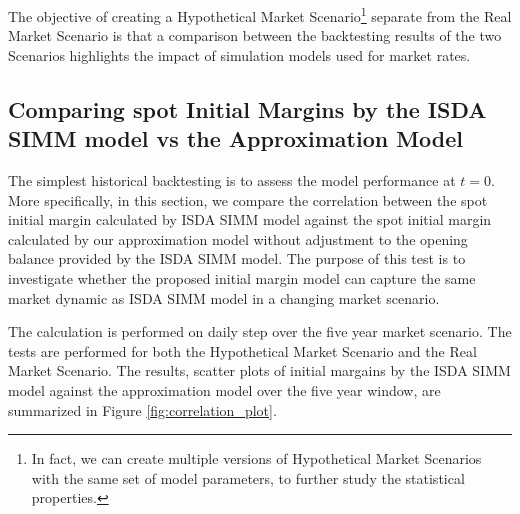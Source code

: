 \documentclass[preprint,12pt]{elsarticle}
\begin{document}
The objective of creating a Hypothetical Market Scenario\footnote{In fact, we can create multiple versions of Hypothetical Market Scenarios with the same set of model parameters, to further study the statistical properties.} separate from the Real Market Scenario is that a comparison between the backtesting results of the two Scenarios highlights the impact of simulation models used for market rates.

\subsection{Comparing spot Initial Margins by the ISDA SIMM model vs the Approximation Model} \label{sec:spotZeroIMTest}

The simplest historical backtesting is to assess the model performance at $t=0$. More specifically, in this section, we compare the correlation between the spot initial margin calculated by ISDA SIMM model against the spot initial margin calculated by our approximation model without adjustment to the opening balance provided by the ISDA SIMM model. The purpose of this test is to investigate whether the proposed initial margin model can capture the same market dynamic as ISDA SIMM model in a changing market scenario. 

The calculation is performed on daily step over the five year market scenario. The tests are performed for both the Hypothetical Market Scenario and the Real Market Scenario. The results, scatter plots of initial margains by the ISDA SIMM model against the approximation model over the five year window, are summarized in Figure \ref{fig:correlation_plot}.
\end{document}

